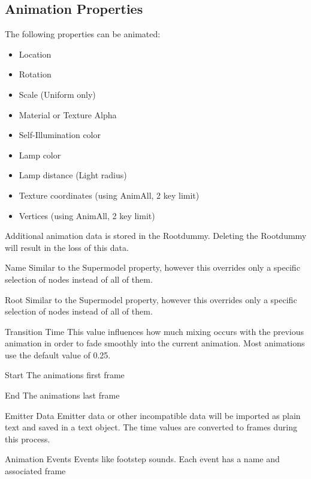 \subsection{Animation Properties}
The following properties can be animated:
\begin{itemize}
    \item Location
    \item Rotation
    \item Scale (Uniform only)
    \item Material or Texture Alpha
    \item Self-Illumination color
    \item Lamp color
    \item Lamp distance (Light radius)
    \item Texture coordinates (using AnimAll, 2 key limit)
    \item Vertices (using AnimAll, 2 key limit)
\end{itemize}
Additional animation data is stored in the Rootdummy. Deleting the Rootdummy will result in
the loss of this data.

\begin{propertyAurora}{Name}
    Similar to the Supermodel property, however this overrides only a 
    specific selection of nodes instead of all of them.
\end{propertyAurora}

\begin{propertyAurora}{Root}
    Similar to the Supermodel property, however this overrides only a 
    specific selection of nodes instead of all of them.
\end{propertyAurora}

\begin{propertyAurora}{Transition Time}
    This value influences how much mixing occurs with the previous animation in order to 
    fade smoothly into the current animation. Most animations use the default value of 0.25.
\end{propertyAurora}

\begin{propertyAurora}{Start}
    The animations first frame
\end{propertyAurora}

\begin{propertyAurora}{End}
    The animations last frame
\end{propertyAurora}

\begin{propertyAurora}{Emitter Data}
    Emitter data or other incompatible data will be imported as plain text and saved in a text object. The
    time values are converted to frames during this process.
\end{propertyAurora}

\begin{propertyAurora}{Animation Events}
    Events like footstep sounds. Each event has a name and associated frame
\end{propertyAurora}